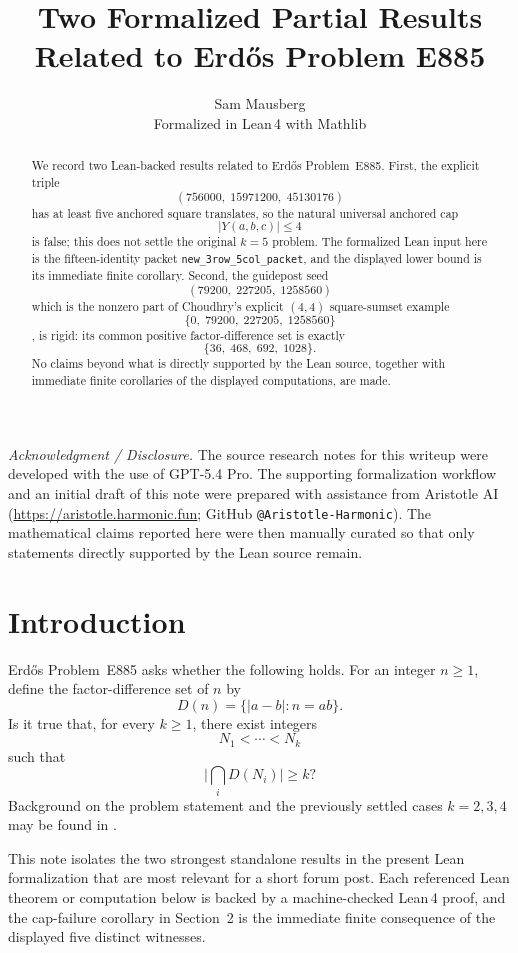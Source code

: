 \documentclass[11pt]{article}
\title{Two Formalized Partial Results Related to Erd\H{o}s Problem E885}
\author{Sam Mausberg\\[0.25em]\normalsize Formalized in Lean\,4 with Mathlib}
\date{}
\theoremstyle{plainbreak}
\theoremstyle{defbreak}
\begin{document}
\maketitle

\begin{center}
\small
\emph{Acknowledgment / Disclosure.}
The source research notes for this writeup were developed with the use of
GPT-5.4 Pro.
The supporting formalization workflow and an initial draft of this note
were prepared with assistance from Aristotle AI
(\url{https://aristotle.harmonic.fun}; GitHub
\texttt{@Aristotle-Harmonic}).
The mathematical claims reported here were then manually curated so that
only statements directly supported by the Lean source remain.
\end{center}

\begin{abstract}
We record two Lean-backed results related to Erd\H{o}s Problem~E885.
First, the explicit triple
\[
  (756000,\;15971200,\;45130176)
\]
has at least five anchored square translates, so the natural universal
anchored cap
\[
  |Y(a,b,c)| \le 4
\]
is false; this does not settle the original $k=5$ problem.
The formalized Lean input here is the fifteen-identity packet
\texttt{new\_3row\_5col\_packet}, and the displayed lower bound is its
immediate finite corollary.
Second, the guidepost seed
\[
  (79200,\;227205,\;1258560)
\]
which is the nonzero part of Choudhry's explicit $(4,4)$ square-sumset
example
\[
  \{0,\;79200,\;227205,\;1258560\}
\]
\cite{Cho25},
is rigid: its common positive factor-difference set is exactly
\[
  \{36,\;468,\;692,\;1028\}.
\]
No claims beyond what is directly supported by the Lean source, together
with immediate finite corollaries of the displayed computations, are made.
\end{abstract}

\section{Introduction}

Erd\H{o}s Problem~E885 asks whether the following holds.
For an integer $n\ge 1$, define the factor-difference set of $n$ by
\[
  D(n) = \{\lvert a-b\rvert : n=ab\}.
\]
Is it true that, for every $k\ge 1$, there exist integers
\[
  N_1 < \cdots < N_k
\]
such that
\[
  \bigl| \bigcap_i D(N_i) \bigr| \ge k?
\]
Background on the problem statement and the previously settled cases
$k=2,3,4$ may be found in
\cite{EP885,ErRo97,Ji99,Br19}.

This note isolates the two strongest standalone results in the present
Lean formalization that are most relevant for a short forum post.
Each referenced Lean theorem or computation below is backed by a
machine-checked Lean\,4 proof, and the cap-failure corollary in
Section~2 is the immediate finite consequence of the displayed five
distinct witnesses.
\end{document}
